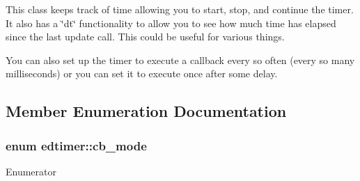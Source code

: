 This class keeps track of time allowing you to start, stop, and continue the timer. It also has a \char`\"{}dt\char`\"{} functionality to allow you to see how much time has elapsed since the last update call. This could be useful for various things.

You can also set up the timer to execute a callback every so often (every so many milliseconds) or you can set it to execute once after some delay. 

\subsection{Member Enumeration Documentation}
\hypertarget{classedtimer_adf4b2a0dcb914d94b59f8dd4a0ae4f09}{
\subsubsection[{cb\-\_\-mode}]{\setlength{\rightskip}{0pt plus 5cm}enum {\bf edtimer\-::cb\-\_\-mode}}}\label{classedtimer_adf4b2a0dcb914d94b59f8dd4a0ae4f09}
\begin{Desc}
\item[Enumerator]\par
\begin{description}
\item[{\em 
\hypertarget{classedtimer_adf4b2a0dcb914d94b59f8dd4a0ae4f09a6401fc860ee0413f08594b95216cbd93}{no\-\_\-shot}\label{classedtimer_adf4b2a0dcb914d94b59f8dd4a0ae4f09a6401fc860ee0413f08594b95216cbd93}
}]\item[{\em 
\hypertarget{classedtimer_adf4b2a0dcb914d94b59f8dd4a0ae4f09a0d89310ad0b56d46e996c74eecaa4fa4}{single\-\_\-shot}\label{classedtimer_adf4b2a0dcb914d94b59f8dd4a0ae4f09a0d89310ad0b56d46e996c74eecaa4fa4}
}]\item[{\em 
\hypertarget{classedtimer_adf4b2a0dcb914d94b59f8dd4a0ae4f09ab949e0f48e271fc30ddac9e033fa2f69}{continous\-\_\-shot}\label{classedtimer_adf4b2a0dcb914d94b59f8dd4a0ae4f09ab949e0f48e271fc30ddac9e033fa2f69}
}]\end{description}
\end{Desc}


